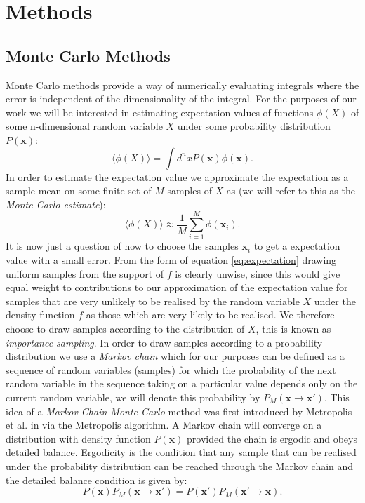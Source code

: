 \documentclass[12pt]{article}
\begin{document}
\section{Methods}
    \subsection{Monte Carlo Methods}
    Monte Carlo methods provide a way of numerically evaluating integrals where the error is independent of the dimensionality of the integral. For the purposes of our work we will be interested in estimating expectation values of functions $\phi\left(X\right)$ of some n-dimensional random variable $X$ under some probability distribution $P\left(\bm{x}\right)$:
    \begin{equation}
        \label{eq:expectation}
        \langle \phi\left(X\right) \rangle = \int d^nxP\left(\bm{x}\right)\phi\left(\bm{x}\right).
    \end{equation}
    In order to estimate the expectation value we approximate the expectation as a sample mean on some finite set of $M$ samples of $X$ as (we will refer to this as the \textit{Monte-Carlo estimate}):
    \begin{equation}
        \langle\phi\left(X\right)\rangle \approx \frac{1}{M} \sum_{i=1}^{M}\phi\left(\bm{x}_i\right).
    \end{equation}
    It is now just a question of how to choose the samples $\bm{x}_i$ to get a expectation value with a small error. From the form of equation \ref{eq:expectation} drawing uniform samples from the support of $f$ is clearly unwise, since this would give equal weight to contributions to our approximation of the expectation value for samples that are very unlikely to be realised by the random variable $X$ under the density function $f$ as those which are very likely to be realised. We therefore choose to draw samples according to the distribution of $X$, this is known as \textit{importance sampling}. In order to draw samples according to a probability distribution we use a \textit{Markov chain} which for our purposes can be defined as a sequence of random variables (samples) for which the probability of the next random variable in the sequence taking on a particular value depends only on the current random variable, we will denote this probability by $P_M\left(\bm{x}\rightarrow \bm{x}'\right)$. This idea of a \textit{Markov Chain Monte-Carlo} method was first introduced by Metropolis et al. in \cite{metropolis_rosenbluth_rosenbluth_teller_teller_1953} via the Metropolis algorithm. A Markov chain will converge on a distribution with density function $P\left(\bm{x}\right)$ provided the chain is ergodic and obeys detailed balance. Ergodicity is the condition that any sample that can be realised under the probability distribution can be reached through the Markov chain and the detailed balance condition is given by: 
    \begin{equation}
        \label{eq:detailedbalance}
        P\left(\bm{x}\right)P_M\left(\bm{x}\rightarrow \bm{x}'\right)=P\left(\bm{x}'\right)P_M\left(\bm{x}'\rightarrow \bm{x}\right).
    \end{equation}
\end{document}

